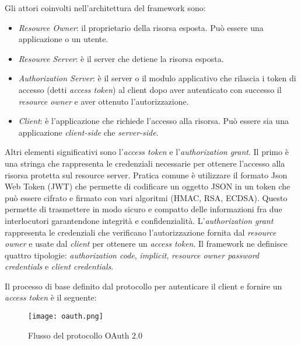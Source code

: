 Gli attori coinvolti nell'architettura del framework sono:
\begin{itemize}
    \item \textit{Resource Owner}: il proprietario della risorsa esposta. Può essere una applicazione o un utente.
    \item \textit{Resource Server}: è il server che detiene la risorsa esposta.
    \item \textit{Authorization Server}: è il server o il modulo applicativo che rilascia i token di accesso (detti \textit{access token}) al client dopo aver
          autenticato con successo il \textit{resource owner} e aver ottenuto l'autorizzazione.
    \item  \textit{Client}: è l'applicazione che richiede l'accesso alla risorsa. Può essere sia una applicazione \textit{client-side} che \textit{server-side}.
\end{itemize}

Altri elementi significativi sono l'\textit{access token} e l'\textit{authorization grant}.
Il primo è una stringa che rappresenta le credenziali necessarie per ottenere l'accesso alla risorsa protetta sul resource server.
Pratica comune è utilizzare il formato Json Web Token\cite{rfc7519} (JWT) che permette di codificare un oggetto JSON in un token
che può essere cifrato e firmato con vari algoritmi (HMAC, RSA, ECDSA). Questo permette di trasmettere in modo sicuro e compatto delle informazioni
fra due interlocutori garantendone integrità e confidenzialità.
L'\textit{authorization grant} rappresenta le credenziali che verificano l'autorizzazione fornita dal \textit{resource owner} e usate dal \textit{client} per ottenere un \textit{access token}.
Il framework ne definisce quattro tipologie: \textit{authorization code}, \textit{implicit}, \textit{resource owner password credentials} e \textit{client credentials}.

Il processo di base definito dal protocollo per autenticare il client e fornire un \textit{access token} è il seguente:
\begin{figure}[h]
    \centering
    \texttt{[image: oauth.png]}
    \caption{Flusso del protocollo OAuth 2.0}
    \label{fig:OAuth2.0}
\end{figure}

